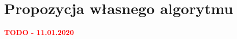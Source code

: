 \documentclass[a4paper,12pt,twoside,openany]{report}
\begin{document}
\chapter{Propozycja własnego algorytmu}
\textcolor{red}{\textbf{TODO - 11.01.2020}}



\end{document}
